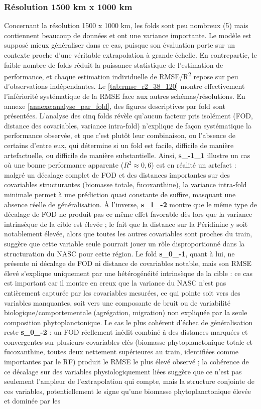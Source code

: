 \documentclass[11pt,a4paper,oneside]{report}
\begin{document}
	\subsubsection{Résolution 1500 km x 1000 km}
	Concernant la résolution 1500 x 1000 km, les folds sont peu nombreux (5) mais contiennent beaucoup de données et ont une variance importante. Le modèle est supposé mieux généraliser dans ce cas, puisque son évaluation porte sur un contexte proche d'une véritable extrapolation à grande échelle. En contrepartie, le faible nombre de folds réduit la puissance statistique de l'estimation de performance, et chaque estimation individuelle de RMSE/R\textsuperscript{2} repose sur peu d'observations indépendantes. Le \ref{tab:rmse_r2_38_120} montre effectivement l'infériorité systématique de la RMSE face aux autres schémas/résolutions. En annexe \ref{annexe:analyse_par_fold}, des figures descriptives par fold sont présentées. L'analyse des cinq folds révèle qu'aucun facteur pris isolément (FOD, distance des covariables, variance intra-fold) n'explique de façon systématique la performance observée, et que c'est plutôt leur combinaison, ou l'absence de certains d'entre eux, qui détermine si un fold est facile, difficile de manière artefactuelle, ou difficile de manière substantielle. Ainsi, \textbf{s\_-1\_1} illustre un cas où une bonne performance apparente ($R^2 \approx 0,6$) est en réalité un artefact : malgré un décalage complet de FOD et des distances importantes sur des covariables structurantes (biomasse totale, fucoxanthine), la variance intra-fold minimale permet à une prédiction quasi constante de suffire, masquant une absence réelle de généralisation. À l'inverse, \textbf{s\_1\_-2} montre que le même type de décalage de FOD ne produit pas ce même effet favorable dès lors que la variance intrinsèque de la cible est élevée ; le fait que la distance sur la Péridinine y soit notablement élevée, alors que toutes les autres covariables sont proches du train, suggère que cette variable seule pourrait jouer un rôle disproportionné dans la structuration du NASC pour cette région. Le fold \textbf{s\_0\_-1}, quant à lui, ne présente ni décalage de FOD ni distance de covariables notable, mais son RMSE élevé s'explique uniquement par une hétérogénéité intrinsèque de la cible : ce cas est important car il montre en creux que la variance du NASC n'est pas entièrement capturée par les covariables mesurées, ce qui pointe soit vers des variables manquantes, soit vers une composante de bruit ou de variabilité biologique/comportementale (agrégation, migration) non expliquée par la seule composition phytoplanctonique. Le cas le plus cohérent d'échec de généralisation reste \textbf{s\_0\_-2} : un FOD réellement inédit combiné à des distances marquées et convergentes sur plusieurs covariables clés (biomasse phytoplanctonique totale et fucoxanthine, toutes deux nettement supérieures au train, identifiées comme importantes par le RF) produit le RMSE le plus élevé observé ; la cohérence de ce décalage sur des variables physiologiquement liées suggère que ce n'est pas seulement l'ampleur de l'extrapolation qui compte, mais la structure conjointe de ces variables, potentiellement le signe qu'une biomasse phytoplanctonique élevée et dominée par les 
\end{document}
